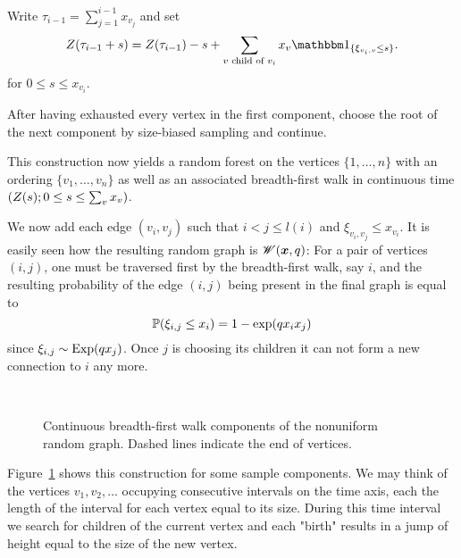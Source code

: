 Write $\tau_{i-1} = \sum_{j = 1}^{i-1} x_{v_j}$ and set
\begin{equation}
	\bfw(\tau_{i-1} + s) = \bfw(\tau_{i-1}) - s + \sum_{\text{$v$ child of $v_i$}} x_v \Ind{\{\xi_{v_i, v} \leq s\}}.
\end{equation}
for $0 \leq s \leq x_{v_i}$.

After having exhausted every vertex in the first component, 
choose the root of the next component by size-biased sampling and continue.

This construction now yields a random forest on the vertices $\{1,  \dots, n\}$
with an ordering $\{v_1, \dots, v_n\}$ 
as well as an associated breadth-first walk in continuous time $(Z(s); 0 \leq s \leq \sum_vx_v)$.

We now add each edge $(v_i, v_j)$ such that $i < j \leq l(i)$ and $\xi_{v_i, v_j} \leq x_{v_i}$.
It is easily seen how the resulting random graph is $\mathscr{W}(\boldsymbol{x}, q)$:
For a pair of vertices $(i, j)$, one must be traversed first by the breadth-first walk, say $i$,
and the resulting probability of the edge $(i,j)$ being present in the final graph is equal to
\begin{equation}
	\mathbb{P}(\xi_{i,j} \leq x_i ) = 1 - \exp(q x_i x_j)
\end{equation}
since $\xi_{i,j} \sim \operatorname*{Exp}(qx_j)$.
Once $j$ is choosing its children it can not form a new connection to $i$ any more.

\begin{figure}[H]
	\centering
	\\
	
	\centering
	
	\caption{Continuous breadth-first walk components of the nonuniform random graph. Dashed lines indicate the end of vertices.}
	\label{F: nonu bf-walk}
\end{figure} 

Figure~\ref{F: nonu bf-walk} shows this construction for some sample components. 
We may think of the vertices $v_1, v_2, \dots$ occupying consecutive intervals on the time axis,
each the length of the interval for each vertex equal to its size.
During this time interval we search for children of the current vertex 
and each "birth" results in a jump of height equal to the size of the new vertex.

